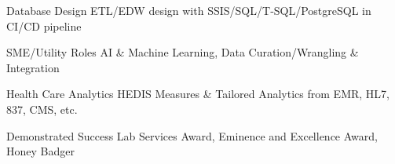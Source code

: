 

\begin{cvskills}

  \cvskill
    {Database Design} %
    {ETL/EDW design with SSIS/SQL/T‑SQL/PostgreSQL in CI/CD pipeline} %

  \cvskill
    {SME/Utility Roles} %
    {AI \& Machine Learning, Data Curation/Wrangling \& Integration} %

  \cvskill
    {Health Care Analytics} %
    {HEDIS Measures \& Tailored Analytics from EMR, HL7, 837, CMS, etc.}

  \cvskill
    {Demonstrated Success} %
    {Lab Services Award, Eminence and Excellence Award, Honey Badger} %

\end{cvskills}




